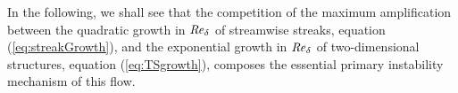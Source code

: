 \documentclass{jfm}
\newcommand\be{\begin{equation}}
\newcommand\ee{\end{equation}}
\newcommand\base{{\rm base}}
\newcommand\Rey{\mbox{\textit{Re}}}  %
\begin{document}
\begin{comment}
\begin{quote}
``The key property of the inflection-point instabilities that control free-shear flows is that they
are essentially inviscid, and that, being already present in the inviscid linearized equations, their
evolution time is $O(1/S)$ [$S$ is the mean shear]. Viscous instabilities such as the Tollmien-Schlichting waves found in the
transition of wall-bounded flows have much slower characteristic times,\ldots''
\end{quote}
The present equation (\ref{eq:tilting}) allows for a different interpretation.
The viscous term, the first term on the right hand side of equation (\ref{eq:tilting})
is negative for any $ \tilde{w} $, meaning that viscosity always damps the
two-dimensional perturbation. Only when the second term
on the right hand side of equation (\ref{eq:tilting})
is positive and in magnitude larger
than the first one, two-dimensional perturbations experience growth.
The growth mechanism itself is thus always inviscid. This
holds for any two-dimensional perturbation, also those being the eigenfunctions
of the Orr-Sommerfeld equation, the modal Tollmien-Schlichting waves.
Whether the growth of the two-dimensional perturbation is fast or slow is, primarily,
a property of the base flow profile $ U_\base $. As we shall see below, 
velocity profiles having an inflection point allow for larger growth rates
than profiles without.

Assuming that for $ \Rey_\delta \rightarrow \infty $, the shape
function $ \tilde{w} $ converges to an asymptotic function, we can conclude that
for large $ \Rey_\delta $, the maximum amplification
of two-dimensional perturbations roughly behaves like:
\be
\max_{\alpha,t_0,t} G(\alpha,\beta=0,t_0,t,\Rey_\delta) \approx
e^{c \Rey_\delta}, \label{eq:TSgrowth}
\ee
where $ c $ is some constant. This exponential growth of the maximum amplification
with the Reynolds number has also been observed for other flows displaying an adverse
pressure gradient. For example, \citet{Biau2016} observed that the maximum amplification
of two-dimensional perturbations for Stokes' second problem grows exponentially
with the Reynolds number.

\end{comment}

In the following, we
shall see that the
competition of
the maximum amplification
between the quadratic growth in $ \Rey_\delta $ 
of streamwise streaks, equation (\ref{eq:streakGrowth}), and
the exponential growth in $ \Rey_\delta $ of two-dimensional structures, 
equation (\ref{eq:TSgrowth}), composes the essential primary instability 
mechanism of this flow. \\
\end{document}

